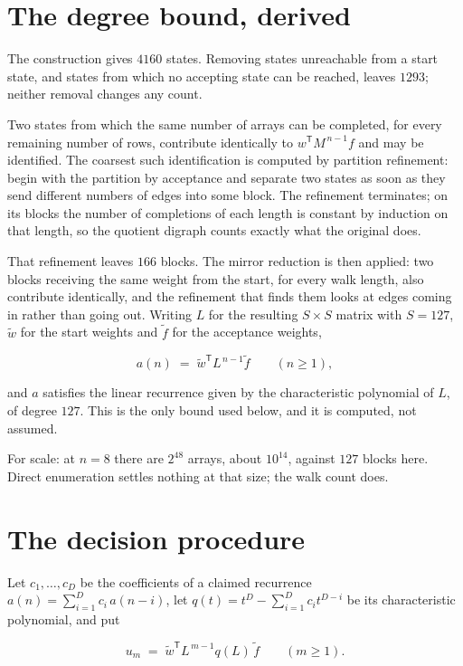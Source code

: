 \documentclass[11pt]{article}
\theoremstyle{definition}
\begin{document}
\section{The degree bound, derived}

The construction gives $4160$ states. Removing states unreachable from a start state, and states from which no accepting state can be reached, leaves $1293$; neither removal changes any count.

Two states from which the same number of arrays can be completed, for every remaining number of rows, contribute identically to $w^{\mathsf T}M^{\,n-1}f$ and may be identified. The coarsest such identification is computed by partition refinement: begin with the partition by acceptance and separate two states as soon as they send different numbers of edges into some block. The refinement terminates; on its blocks the number of completions of each length is constant by induction on that length, so the quotient digraph counts exactly what the original does.

That refinement leaves $166$ blocks. The mirror reduction is then applied: two blocks receiving the same weight from the start, for every walk length, also contribute identically, and the refinement that finds them looks at edges coming in rather than going out. Writing $L$ for the resulting $S \times S$ matrix with $S = 127$, $\tilde w$ for the start weights and $\tilde f$ for the acceptance weights,

\[a(n) \;=\; \tilde w^{\mathsf T} L^{\,n-1} \tilde f \qquad (n \ge 1),\]

and $a$ satisfies the linear recurrence given by the characteristic polynomial of $L$, of degree $127$. This is the only bound used below, and it is computed, not assumed.

For scale: at $n = 8$ there are $2^{48}$ arrays, about $10^{14}$, against $127$ blocks here. Direct enumeration settles nothing at that size; the walk count does.

\section{The decision procedure}

Let $c_1,\dots,c_D$ be the coefficients of a claimed recurrence $a(n) = \sum_{i=1}^{D} c_i\,a(n-i)$, let $q(t) = t^{D} - \sum_{i=1}^{D} c_i t^{D-i}$ be its characteristic polynomial, and put

\[u_m \;=\; \tilde w^{\mathsf T} L^{\,m-1} q(L)\,\tilde f \qquad (m \ge 1).\]
\end{document}
